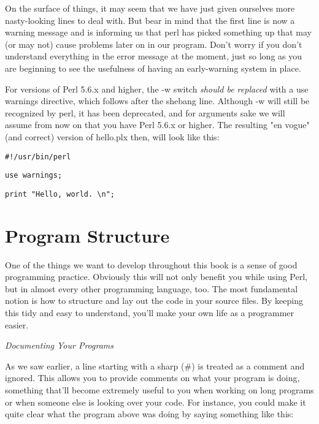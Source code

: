 \documentclass[a4paper,11pt]{book}
\begin{document}
\noindent 

\noindent On the surface of things, it may seem that we have just given ourselves more nasty-looking lines to deal with. But bear in mind that the first line is now a warning message and is informing us that perl has picked something up that may (or may not) cause problems later on in our program. Don't worry if you don't understand everything in the error message at the moment, just so long as you are beginning to see the usefulness of having an early-warning system in place.

\noindent 

\noindent For versions of Perl 5.6.x and higher, the -w switch \textit{should be replaced }with a use warnings directive, which follows after the shebang line. Although -w will still be recognized by perl, it has been deprecated, and for arguments sake we will assume from now on that you have Perl 5.6.x or higher. The resulting "en vogue" (and correct) version of hello.plx then, will look like this:

\noindent 

\noindent \texttt{\#!/usr/bin/perl}

\noindent \texttt{use warnings;}

\noindent 

\noindent \texttt{print "Hello, world. \textbackslash n";}

\noindent 

\section{Program Structure}

\noindent 

\noindent One of the things we want to develop throughout this book is a sense of good programming practice. Obviously this will not only benefit you while using Perl, but in almost every other programming language, too. The most fundamental notion is how to structure and lay out the code in your source files. By keeping this tidy and easy to understand, you'll make your own life as a programmer easier.

\noindent 

\noindent \textit{Documenting Your Programs}

\noindent As we saw earlier, a line starting with a sharp (\#) is treated as a comment and ignored. This allows you to provide comments on what your program is doing, something that'll become extremely useful to you when working on long programs or when someone else is looking over your code. For instance, you could make it quite clear what the program above was doing by saying something like this:
\end{document}
